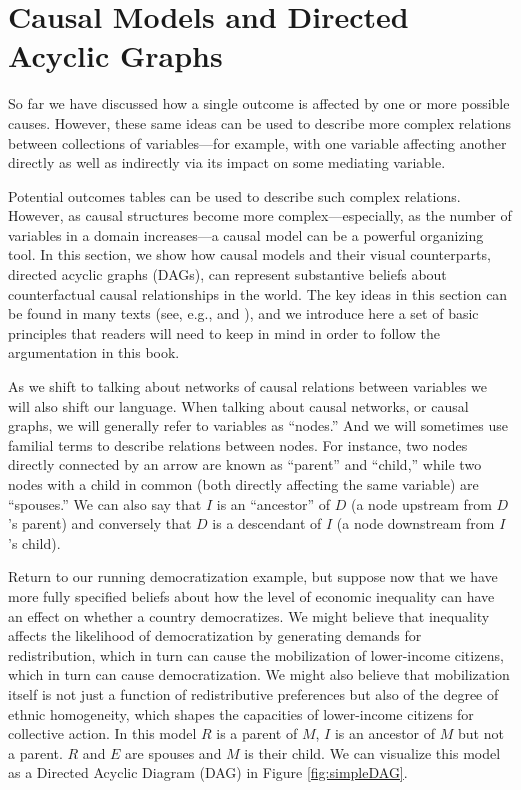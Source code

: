 \documentclass[
  12pt,
]{book}
\begin{document}
\hypertarget{causal-models-and-directed-acyclic-graphs}{%
\section{Causal Models and Directed Acyclic Graphs}\label{causal-models-and-directed-acyclic-graphs}}

So far we have discussed how a single outcome is affected by one or more possible causes. However, these same ideas can be used to describe more complex relations between collections of variables---for example, with one variable affecting another directly as well as indirectly via its impact on some mediating variable.

Potential outcomes tables can be used to describe such complex relations. However, as causal structures become more complex---especially, as the number of variables in a domain increases---a causal model can be a powerful organizing tool. In this section, we show how causal models and their visual counterparts, directed acyclic graphs (DAGs), can represent substantive beliefs about counterfactual causal relationships in the world. The key ideas in this section can be found in many texts (see, e.g., \citet{halpern2005causesa} and \citet{galles1998axiomatic}), and we introduce here a set of basic principles that readers will need to keep in mind in order to follow the argumentation in this book.

As we shift to talking about networks of causal relations between variables we will also shift our language. When talking about causal networks, or causal graphs, we will generally refer to variables as ``nodes.'' And we will sometimes use familial terms to describe relations between nodes. For instance, two nodes directly connected by an arrow are known as ``parent'' and ``child,'' while two nodes with a child in common (both directly affecting the same variable) are ``spouses.'' We can also say that \(I\) is an ``ancestor'' of \(D\) (a node upstream from \(D\)'s parent) and conversely that \(D\) is a descendant of \(I\) (a node downstream from \(I\)'s child).

Return to our running democratization example, but suppose now that we have more fully specified beliefs about how the level of economic inequality can have an effect on whether a country democratizes. We might believe that inequality affects the likelihood of democratization by generating demands for redistribution, which in turn can cause the mobilization of lower-income citizens, which in turn can cause democratization. We might also believe that mobilization itself is not just a function of redistributive preferences but also of the degree of ethnic homogeneity, which shapes the capacities of lower-income citizens for collective action. In this model \(R\) is a parent of \(M\), \(I\) is an ancestor of \(M\) but not a parent. \(R\) and \(E\) are spouses and \(M\) is their child. We can visualize this model as a Directed Acyclic Diagram (DAG) in Figure \ref{fig:simpleDAG}.
\end{document}
